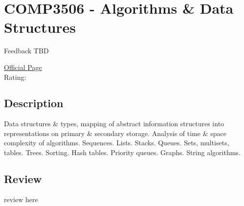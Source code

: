 \hypertarget{COMP3506}{\section{COMP3506 - Algorithms \& Data Structures}}
Feedback TBD

\large
\textcolor{turbo_purple}{\href{https://my.uq.edu.au/programs-courses/course.html?course_code=COMP3506}{Official Page}} \\
Rating: \cstar\cstar\cstar\cstar\ostar

\normalsize
\subsection*{Description}
Data structures \& types, mapping of abstract information structures into representations on primary \& secondary storage. Analysis of time \& space complexity of algorithms. Sequences. Lists. Stacks. Queues. Sets, multisets, tables. Trees. Sorting. Hash tables. Priority queues. Graphs. String algorithms.

\subsection*{Review}
review here
